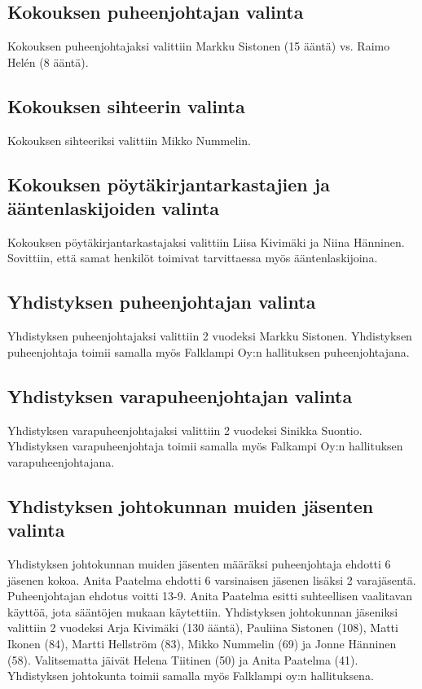 \documentclass[a4paper,12pt]{article}
\begin{document}
\subsection{Kokouksen puheenjohtajan valinta}
Kokouksen puheenjohtajaksi valittiin Markku Sistonen (15 ääntä) vs. Raimo Helén (8 ääntä).
\subsection{Kokouksen sihteerin valinta}
Kokouksen sihteeriksi valittiin Mikko Nummelin.
\subsection{Kokouksen pöytäkirjantarkastajien ja ääntenlaskijoiden valinta}
Kokouksen pöytäkirjantarkastajaksi valittiin Liisa Kivimäki ja Niina Hänninen. Sovittiin, että samat henkilöt toimivat tarvittaessa myös ääntenlaskijoina.
\subsection{Yhdistyksen puheenjohtajan valinta}
Yhdistyksen puheenjohtajaksi valittiin 2 vuodeksi Markku Sistonen. Yhdistyksen puheenjohtaja toimii samalla myös Falklampi Oy:n hallituksen puheenjohtajana.
\subsection{Yhdistyksen varapuheenjohtajan valinta}
Yhdistyksen varapuheenjohtajaksi valittiin 2 vuodeksi Sinikka Suontio. Yhdistyksen varapuheenjohtaja toimii samalla myös Falkampi Oy:n hallituksen varapuheenjohtajana.
\subsection{Yhdistyksen johtokunnan muiden jäsenten valinta}
Yhdistyksen johtokunnan muiden jäsenten määräksi puheenjohtaja ehdotti 6 jäsenen kokoa. Anita Paatelma ehdotti 6 varsinaisen jäsenen lisäksi 2 varajäsentä. Puheenjohtajan ehdotus voitti 13-9. Anita Paatelma esitti suhteellisen vaalitavan käyttöä, jota sääntöjen mukaan käytettiin. Yhdistyksen johtokunnan jäseniksi valittiin 2 vuodeksi Arja Kivimäki (130 ääntä), Pauliina Sistonen (108), Matti Ikonen (84), Martti Hellström (83), Mikko Nummelin (69) ja Jonne Hänninen (58). Valitsematta jäivät Helena Tiitinen (50) ja Anita Paatelma (41). Yhdistyksen johtokunta toimii samalla myös Falklampi oy:n hallituksena.
\end{document}
